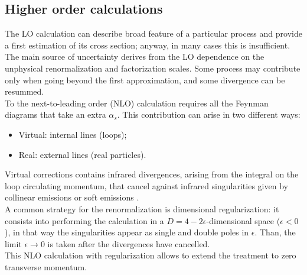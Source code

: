 \subsection{Higher order calculations}

The LO calculation can describe broad feature of a particular process and provide a first estimation of its cross section; anyway, in many cases this is insufficient.
\\
The main source of uncertainty derives from the LO dependence  on the unphysical renormalization and factorization scales. Some process may contribute only when going beyond the first approximation, and some divergence can be resummed. 
\\
To the next-to-leading order (NLO) calculation requires all the Feynman diagrams that take an extra $\alpha_s$. This contribution can arise in two different ways:
\begin{itemize}
	\item Virtual: internal lines (loops);
	\item Real: external lines (real particles).
\end{itemize}
Virtual corrections contains infrared divergences, arising from the integral on the loop circulating momentum, that cancel against infrared singularities given by collinear emissions or soft emissions \cite{PhysRevBloch, KinoshitaToichiro, PhysRevLee}. 
\\
A common strategy for the renormalization is dimensional regularization: it consists into performing the calculation in a $D=4-2\epsilon$-dimensional space ($\epsilon<0$), in that way the singularities appear as single and double poles in $\epsilon$. Than, the limit $\epsilon\rightarrow0$ is taken after the divergences have cancelled.
\\
This NLO calculation with regularization allows to extend the treatment to zero transverse momentum.

